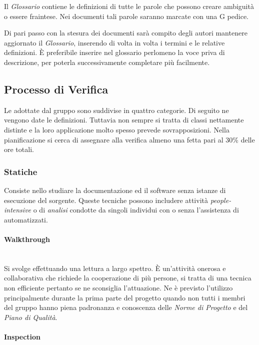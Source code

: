 Il \textit{Glossario} contiene le definizioni di tutte le parole che possono creare ambiguità o essere fraintese. Nei documenti tali parole saranno marcate con una G pedice.

Di pari passo con la stesura dei documenti sarà compito degli autori mantenere aggiornato il \textit{Glossario}, inserendo di volta in volta i termini e le relative definizioni. È preferibile inserire nel glossario perlomeno la voce priva di descrizione, per poterla successivamente completare più facilmente.

\subsection{Processo di Verifica}
	Le  adottate dal gruppo sono suddivise in quattro categorie. Di seguito ne vengono date le definizioni. Tuttavia non sempre si tratta di classi nettamente distinte e la loro applicazione molto spesso prevede sovrapposizioni.
	Nella pianificazione si cerca di assegnare alla verifica almeno una fetta pari al 30$\%$ delle ore totali.
	
		\subsubsection{Statiche}

		Consiste nello studiare la documentazione ed il software senza istanze di esecuzione del sorgente. Queste tecniche possono includere attività \emph{people-intensive} o di \emph{analisi} condotte da singoli individui con o senza l'assistenza di  automatizzati.

			\paragraph{Walkthrough} \mbox{} \\
			
			Si svolge effettuando una lettura a largo spettro. È un'attività onerosa e collaborativa che richiede la cooperazione di più persone, si tratta di una tecnica non efficiente pertanto se ne sconsiglia l'attuazione. Ne è previsto l'utilizzo principalmente durante la prima parte del progetto quando non tutti i membri del gruppo hanno piena padronanza e conoscenza delle \emph{Norme di Progetto} e del \emph{Piano di Qualità}.

			\paragraph{Inspection} \mbox{} \\
			\label{anomaliefrequenti}

